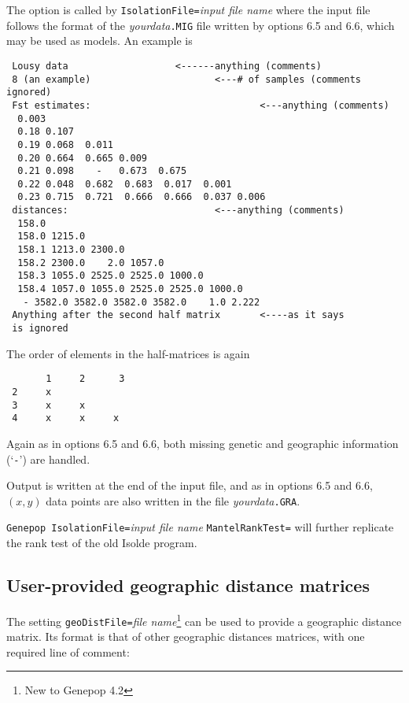 \documentclass[12pt,]{book}
\let\rmarkdownfootnote\footnote%
\def\footnote{\protect\rmarkdownfootnote}
\begin{document}
The option is called by \texttt{IsolationFile=}\emph{input file name}
where the input file follows the
format of the
\emph{yourdata}\texttt{.MIG} file written by options 6.5 and 6.6, which
may be used as models. An example is

\begin{verbatim}
 Lousy data                   <------anything (comments)
 8 (an example)                      <---# of samples (comments ignored)
 Fst estimates:                              <---anything (comments)
  0.003
  0.18 0.107
  0.19 0.068  0.011
  0.20 0.664  0.665 0.009
  0.21 0.098    -   0.673  0.675
  0.22 0.048  0.682  0.683  0.017  0.001
  0.23 0.715  0.721  0.666  0.666  0.037 0.006
 distances:                          <---anything (comments)
  158.0
  158.0 1215.0
  158.1 1213.0 2300.0
  158.2 2300.0    2.0 1057.0
  158.3 1055.0 2525.0 2525.0 1000.0
  158.4 1057.0 1055.0 2525.0 2525.0 1000.0
   - 3582.0 3582.0 3582.0 3582.0    1.0 2.222
 Anything after the second half matrix       <----as it says
 is ignored
\end{verbatim}

The order of elements in the half-matrices is again

\begin{verbatim}
       1     2      3
 2     x
 3     x     x
 4     x     x     x
\end{verbatim}

Again as in options 6.5 and 6.6, both missing genetic and geographic
information (`\texttt{-}') are handled.

Output is written at the end of the input file, and as in options 6.5
and 6.6, \((x,y)\) data points are also written in the file
\emph{yourdata}\texttt{.GRA}.

\texttt{Genepop\ IsolationFile=}\emph{input file name}
\texttt{MantelRankTest=} will further replicate the rank test of the old
Isolde program.

\subsection{User-provided geographic distance
matrices}\label{user-provided-geographic-distance-matrices}

The setting \texttt{geoDistFile=}\emph{file
name}\footnote{New to Genepop 4.2} can be
used to provide a geographic distance matrix. Its format is that of
other geographic distances matrices, with one required line of comment:
\end{document}
